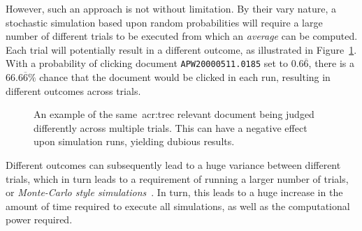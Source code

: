 However, such an approach is not without limitation. By their vary nature, a stochastic simulation based upon random probabilities will require a large number of different trials to be executed from which an \emph{average} can be computed. Each trial will potentially result in a different outcome, as illustrated in Figure~\ref{fig:multiple_runs}. With a probability of clicking document \texttt{APW20000511.0185} set to $0.6\overline{6}$, there is a $66.6\overline{6}\%$ chance that the document would be clicked in each run, resulting in different outcomes across trials.

\begin{figure}[t!]
    \centering
    \vspace{4mm}
    \caption[The problem of stochastic judgements]{An example of the same~\gls{acr:trec} relevant document being judged differently across multiple trials. This can have a negative effect upon simulation runs, yielding dubious results.}
    \label{fig:multiple_runs}
\end{figure}

Different outcomes can subsequently lead to a huge variance between different trials, which in turn leads to a requirement of running a larger number of trials, or \emph{Monte-Carlo style simulations}~\citep{benov2016manhattan}. In turn, this leads to a huge increase in the amount of time required to execute all simulations, as well as the computational power required.

